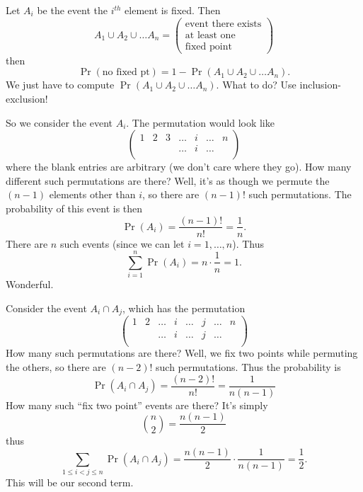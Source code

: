 Let $A_{i}$ be the event the $i^{th}$ element is fixed. Then 
\begin{equation}
A_1\cup A_2\cup\dots A_n = \begin{pmatrix}\mbox{event there exists}\\
\mbox{at least one}\\
\mbox{fixed point}
\end{pmatrix}
\end{equation}
then
\begin{equation}
\Pr(\mbox{no fixed pt}) = 1-\Pr(A_1\cup A_2\cup\dots A_n).
\end{equation}
We just have to compute $\Pr(A_1\cup A_2\cup\dots A_n)$. What to do? Use
inclusion-exclusion!

\M So we consider the event $A_{i}$. The permutation would look like
\begin{equation}
\begin{pmatrix}
1 & 2 & 3 & \dots & i & \dots & n\\
  &   &   & \dots & i & \dots &  \\
\end{pmatrix}
\end{equation}
where the blank entries are arbitrary (we don't care where they go). How
many different such permutations are there? Well, it's as though we
permute the $(n-1)$ elements other than $i$, so there are $(n-1)!$ such
permutations. The probability of this event is then
\begin{equation}
\Pr(A_{i}) = \frac{(n-1)!}{n!} = \frac{1}{n}.
\end{equation}
There are $n$ such events (since we can let $i=1,\dots,n$). Thus
\begin{equation}
\sum^{n}_{i=1}\Pr(A_{i}) = n\cdot\frac{1}{n}=1.
\end{equation}
Wonderful.

\M Consider the event $A_i\cap A_j$, which has the permutation
\begin{equation}
\begin{pmatrix}
1 & 2 & \dots & i & \dots & j & \dots & n\\
  &   & \dots & i & \dots & j & \dots &  \\
\end{pmatrix}
\end{equation}
How many such permutations are there? Well, we fix two points while
permuting the others, so there are $(n-2)!$ such permutations. Thus the
probability is
\begin{equation}
\Pr(A_{i}\cap A_{j}) = \frac{(n-2)!}{n!}=\frac{1}{n(n-1)}
\end{equation}
How many such ``fix two point'' events are there? It's simply
\begin{equation}
\binom{n}{2}=\frac{n(n-1)}{2}
\end{equation}
thus
\begin{equation}
\sum_{1\leq i<j\leq n} \Pr(A_{i}\cap A_{j})
= \frac{n(n-1)}{2}\cdot\frac{1}{n(n-1)}=\frac{1}{2}.
\end{equation}
This will be our second term.

